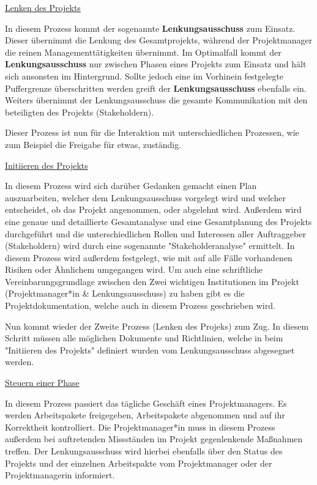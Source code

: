 \pagebreak
\underline{Lenken des Projekts}

In diesem Prozess kommt der sogenannte \textbf{Lenkungsausschuss} zum Einsatz. Dieser übernimmt die Lenkung des Gesamtprojekts, während der Projektmanager die reinen Managementtätigkeiten übernimmt. Im Optimalfall kommt der \textbf{Lenkungsausschuss} nur zwischen Phasen eines Projekts zum Einsatz und hält sich ansonsten im Hintergrund. Sollte jedoch eine im Vorhinein festgelegte Puffergrenze überschritten werden greift der \textbf{Lenkungsausschuss} ebenfalls ein. Weiters übernimmt der Lenkungsausschuss die gesamte Kommunikation mit den beteiligten des Projekts (Stakeholdern).

Dieser Prozess ist nun für die Interaktion mit unterschiedlichen Prozessen, wie zum Beispiel die Freigabe für etwas, zuständig. \cite{Prince2}

\underline{Initiieren des Projekts}

In diesem Prozess wird sich darüber Gedanken gemacht einen Plan auszuarbeiten, welcher dem Lenkungsausschuss vorgelegt wird und welcher entscheidet, ob das Projekt angenommen, oder abgelehnt wird. Außerdem wird eine genaue und detaillierte Gesamtanalyse und eine Gesamtplanung des Projekts durchgeführt und die unterschiedlichen Rollen und Interessen aller Auftraggeber (Stakeholdern) wird durch eine sogenannte "Stakeholderanalyse" ermittelt. In diesem Prozess wird außerdem festgelegt, wie mit auf alle Fälle vorhandenen Risiken oder Ähnlichem umgegangen wird. Um auch eine schriftliche Vereinbarungsgrundlage zwischen den Zwei wichtigen Institutionen im Projekt (Projektmanager*in \& Lenkungsausschuss) zu haben gibt es die Projektdokumentation, welche auch in diesem Prozess geschrieben wird.

Nun kommt wieder der Zweite Prozess (Lenken des Projeks) zum Zug. In diesem Schritt müssen alle möglichen Dokumente und Richtlinien, welche in beim "Initiieren des Projekts" definiert wurden vom Lenkungsausschuss abgesegnet werden. \cite{Prince2} \cite{Stakeholder}

\underline{Steuern einer Phase}

In diesem Prozess passiert das tägliche Geschäft eines Projektmanagers. Es werden Arbeitspakete freigegeben, Arbeitspakete abgenommen und auf ihr Korrektheit kontrolliert. Die Projektmanager*in muss in diesem Prozess außerdem bei auftretenden Missständen im Projekt gegenlenkende Maßnahmen treffen. Der Lenkungsausschuss wird hierbei ebenfalls über den Status des Projekts und der einzelnen Arbeitspakte vom Projektmanager oder der Projektmanagerin informiert.

